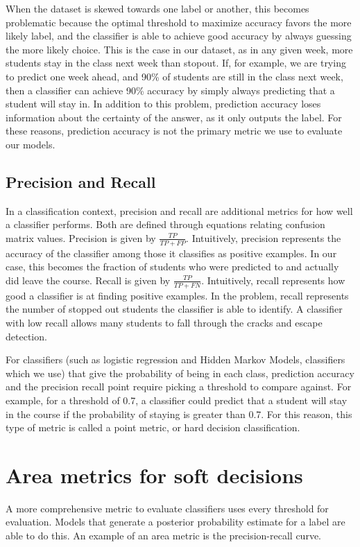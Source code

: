 When the dataset is skewed towards one label or another, this becomes problematic because the optimal threshold to maximize accuracy favors the more likely label, and the classifier is able to achieve good accuracy by always guessing the more likely choice. This is the case in our dataset, as in any given week, more students stay in the class next week than stopout. If, for example, we are trying to predict one week ahead, and 90\% of students are still in the class next week, then a classifier can achieve 90\% accuracy by simply always predicting that a student will stay in. In addition to this problem, prediction accuracy loses information about the certainty of the answer, as it only outputs the label. For these reasons, prediction accuracy is not the primary metric we use to evaluate our models.

\subsection{Precision and Recall}
In a classification context, precision and recall are additional metrics for how well a classifier performs. Both are defined through equations relating confusion matrix values. 
Precision is given by $\frac{TP}{TP + FP}$. Intuitively, precision represents the accuracy of the classifier among those it classifies as positive examples. In our case, this becomes the fraction of students who were predicted to \sti and actually did leave the course.
Recall is given by $\frac{TP}{TP + FN}$. Intuitively, recall represents how good a classifier is at finding positive examples. In the \sti problem, recall represents the number of stopped out students the classifier is able to identify. A classifier with low recall allows many \sti students to fall through the cracks and escape detection.

For classifiers (such as logistic regression and Hidden Markov Models, classifiers which we use) that give the probability of being in each class, prediction accuracy and the precision recall point require picking a threshold to compare against. For example, for a threshold of 0.7, a classifier could predict that a student will stay in the course if the probability of staying is greater than 0.7. For this reason, this type of metric is called a point metric, or hard decision classification.

\section{Area metrics for soft decisions}
A more comprehensive metric to evaluate classifiers uses every threshold for evaluation. Models that generate a posterior probability estimate for a label are able to do this. An example of an area metric is the precision-recall curve.

